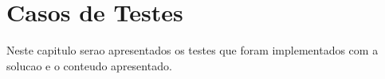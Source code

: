 \newpage
\chapter{Casos de Testes}
Neste capitulo serao apresentados os testes que foram implementados com a solucao e o conteudo apresentado.


